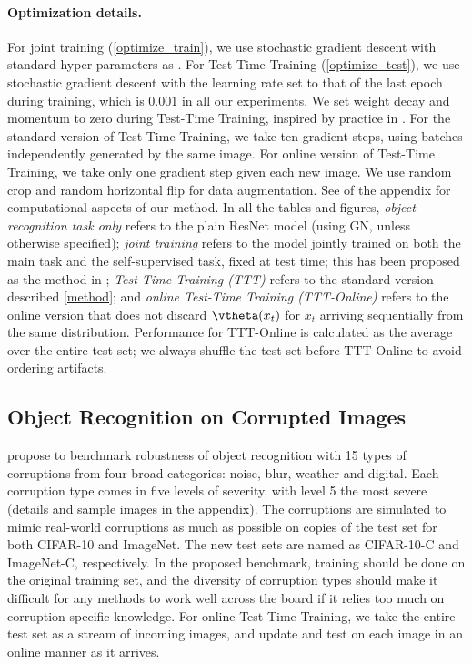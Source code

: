 \paragraph{Optimization details.}
For joint training (\autoref{optimize_train}),
we use stochastic gradient descent with standard hyper-parameters as \citep{huang2016deep, he2016deep}.
For Test-Time Training (\autoref{optimize_test}), we use stochastic gradient descent with the learning rate set to that of the last epoch during training, which is 0.001 in all our experiments. We set weight decay and momentum to zero during Test-Time Training, inspired by practice in \citep{he2018rethinking, liu2018rethinking}. For the standard version of Test-Time Training, we take ten gradient steps, using batches independently generated by the same image.
For online version of Test-Time Training, we take only one gradient step given each new image. We use random crop and random horizontal flip for data augmentation. See  of the appendix for computational aspects of our method.
In all the tables and figures, \emph{object recognition task only} refers to the plain ResNet model (using GN, unless otherwise specified);
\emph{joint training}
refers to the model jointly trained on both the main task and the self-supervised task, fixed at test time; this has been proposed as the method in \citet{hendrycks2019using};
\emph{Test-Time Training (TTT)}  refers to the standard version described \autoref{method};
and \emph{online Test-Time Training (TTT-Online)}  refers to the online version that does not discard $\vtheta(x_t)$ for $x_t$ arriving sequentially from the same distribution.
Performance for TTT-Online is calculated as the average over the entire test set; we always shuffle the test set before TTT-Online to avoid ordering artifacts.

\subsection{Object Recognition on Corrupted Images}
\label{results_cc}
\citet{hendrycks2019benchmarking} propose to benchmark robustness of object recognition with 15 types of corruptions
from four broad categories: noise, blur, weather and digital.  Each corruption type comes in five levels of severity, with level 5 the most severe (details and sample images in the appendix).
The corruptions are simulated to mimic real-world corruptions as much as possible on copies of the test set for both CIFAR-10 and ImageNet. The new test sets are named as CIFAR-10-C and ImageNet-C, respectively. 
In the proposed benchmark, training should be done on the original training set, and the diversity of corruption types should make it difficult for any methods to work well across the board if it relies too much on corruption specific knowledge. For online Test-Time Training, we take the entire test set as a stream of incoming images, and update and test on each image in an online manner as it arrives.

